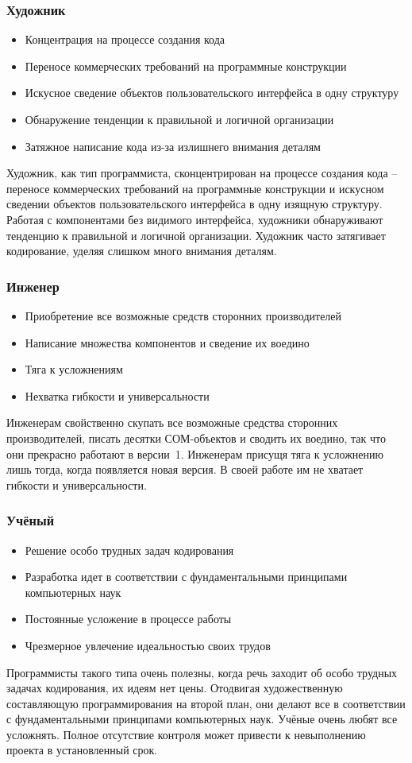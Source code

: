 \documentclass{../industrial-development}
\begin{document}
{\begin{frame} \frametitle{Художник}
	 \begin{itemize}
                     \item Концентрация на процессе создания кода
		\item Переносе коммерческих требований на программные конструкции
 		\item Искусное сведение объектов пользовательского интерфейса в одну структуру
 		\item Обнаружение тенденции к правильной и логичной организации
		\item Затяжное написание кода из-за излишнего внимания деталям
		\end{itemize}
\end{frame}
\lecturenotes
Художник, как тип программиста, сконцентрирован на процессе создания кода – переносе коммерческих требований на программные конструкции и искусном сведении объектов пользовательского интерфейса в одну изящную структуру. Работая с компонентами без видимого интерфейса, художники обнаруживают тенденцию к правильной и логичной организации. 
Художник часто затягивает кодирование, уделяя слишком много внимания деталям.

\begin{frame} \frametitle{Инженер}
 \begin{itemize}
                     \item Приобретение все возможные средств сторонних производителей
		\item Написание множества компонентов и сведение их воедино
 		\item Тяга к усложнениям
 		\item Нехватка гибкости и универсальности
		\end{itemize}
\end{frame}
\lecturenotes
	Инженерам свойственно скупать все возможные средства сторонних производителей, писать десятки СОМ-объектов и сводить их воедино, так что они прекрасно работают в версии~1.
Инженерам присущя тяга к усложнению лишь тогда, когда появляется новая версия. В своей работе им не хватает гибкости и универсальности.

\begin{frame} \frametitle{Учёный}
 \begin{itemize}
		\item Решение особо трудных задач кодирования
                     \item Разработка идет в соответствии с фундаментальными принципами компьютерных наук
		\item Постоянные усложение в процессе работы
		\item Чрезмерное увлечение идеальностью своих трудов
		\end{itemize}
\end{frame}
\lecturenotes
	Программисты такого типа очень полезны, когда речь заходит об особо трудных задачах кодирования, их идеям нет цены. Отодвигая художественную составляющую программирования на второй план, они делают все в соответствии с фундаментальными принципами компьютерных наук.
	 Учёные очень любят все усложнять. Полное отсутствие контроля может привести к невыполнению проекта в установленный срок.

}
\end{document}
